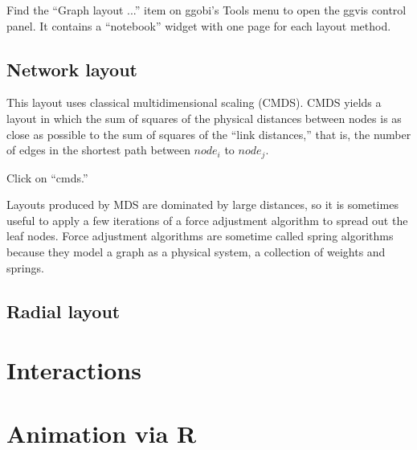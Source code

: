 \documentclass[11pt]{article}
\begin{document}
Find the ``Graph layout ...'' item on ggobi's Tools menu
to open the ggvis control panel.  It contains a ``notebook''
widget with one page for each layout method.

\subsection {Network layout}

This layout uses classical multidimensional scaling (CMDS).  CMDS yields a
layout in which the sum of squares of the physical distances between nodes
is as close as possible to the sum of squares of the ``link distances,''
that is, the number of edges in the shortest path between $node_i$
to $node_j$.

Click on ``cmds.''

Layouts produced by MDS are dominated by large distances, so it
is sometimes useful to apply a few iterations of a force adjustment
algorithm to spread out the leaf nodes.  Force adjustment algorithms
are sometime called spring algorithms because they model a graph as
a physical system, a collection of weights and springs.

\subsection {Radial layout}

\section{Interactions}


\section{Animation via R}

\end{document}
